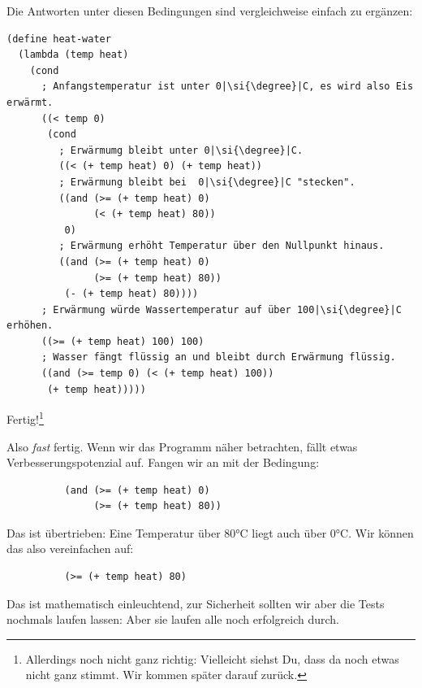 %
Die Antworten unter diesen Bedingungen sind vergleichweise einfach zu
ergänzen:
%
\begin{lstlisting}
(define heat-water
  (lambda (temp heat)
    (cond
      ; Anfangstemperatur ist unter 0|\si{\degree}|C, es wird also Eis erwärmt.
      ((< temp 0)
       (cond
         ; Erwärmumg bleibt unter 0|\si{\degree}|C.
         ((< (+ temp heat) 0) (+ temp heat))
         ; Erwärmung bleibt bei  0|\si{\degree}|C "stecken".
         ((and (>= (+ temp heat) 0)
               (< (+ temp heat) 80))
          0)
         ; Erwärmung erhöht Temperatur über den Nullpunkt hinaus.
         ((and (>= (+ temp heat) 0)
               (>= (+ temp heat) 80))
          (- (+ temp heat) 80))))
      ; Erwärmung würde Wassertemperatur auf über 100|\si{\degree}|C erhöhen.
      ((>= (+ temp heat) 100) 100)
      ; Wasser fängt flüssig an und bleibt durch Erwärmung flüssig.
      ((and (>= temp 0) (< (+ temp heat) 100))
       (+ temp heat)))))
\end{lstlisting}
%
Fertig!\footnote{Allerdings noch nicht ganz richtig: Vielleicht siehst Du,
  dass da noch etwas nicht ganz stimmt.  Wir kommen später darauf zurück.}

\medskip

Also \emph{fast} fertig.  Wenn wir das Programm näher betrachten,
fällt etwas Verbesserungspotenzial auf.  Fangen wir an mit der
Bedingung:
%
\begin{lstlisting}
          (and (>= (+ temp heat) 0)
               (>= (+ temp heat) 80))
\end{lstlisting}
%
Das ist übertrieben: Eine Temperatur über 80\si{\degree}C liegt auch über 0\si{\degree}C.
Wir können das also vereinfachen auf:
%
\begin{lstlisting}
          (>= (+ temp heat) 80)
\end{lstlisting}
%
Das ist mathematisch einleuchtend, zur Sicherheit sollten wir aber die
Tests nochmals laufen lassen: Aber sie laufen alle noch erfolgreich
durch.

